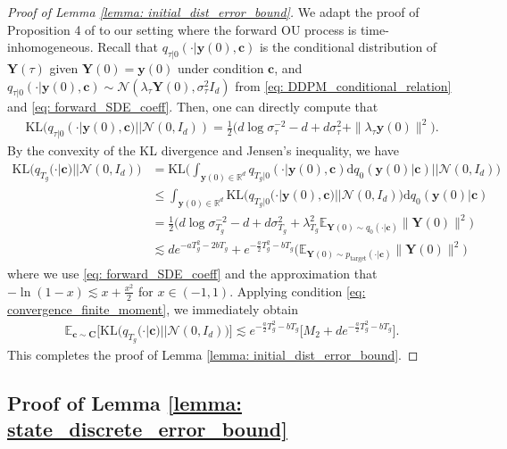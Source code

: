 \documentclass[11pt]{article}
\newcommand{\mE}{\mathbb{E}}
\newcommand{\mR}{\mathbb{R}}
\newcommand{\bY}{\mathbf{Y}}
\newcommand{\by}{\mathbf{y}}
\newcommand{\bc}{\mathbf{c}}
\newcommand{\bC}{\mathbf{C}}
\newcommand{\tar}{{\text{target}}}
\newcommand{\KL}{\text{KL}}
\newcommand{\intd}{\mathrm{d}}
\begin{document}
\begin{proof}[Proof of Lemma \ref{lemma: initial_dist_error_bound}]
We adapt the proof of Proposition 4 of \cite{bentonnearly} to our setting where the forward OU process is time-inhomogeneous. Recall that $q_{\tau | 0}(\cdot | \by(0),  \bc)$ is the conditional distribution of $\bY(\tau)$ given $\bY(0) = \by(0)$ under condition $\bc$, and $q_{\tau | 0}(\cdot | \by(0),  \bc) \sim \mathcal{N}(\lambda_\tau \bY(0), \sigma_\tau^2I_d)$ from \eqref{eq: DDPM_conditional_relation} and \eqref{eq: forward_SDE_coeff}. Then, one can directly compute that
\begin{align*}
    \KL(q_{\tau | 0}(\cdot | \by(0),  \bc) || \mathcal{N}(0, I_d)) = \frac{1}{2}\big(d\log\sigma_\tau^{-2} - d + d\sigma_\tau^2 + \|\lambda_\tau\by(0)\|^2\big).
\end{align*}
By the convexity of the KL divergence and Jensen's inequality, we have
\begin{align*}
    \KL\big(q_{T_g}(\cdot | \bc) || \mathcal{N}(0, I_d)\big) &= \KL\bigg(\int_{\by(0)\in\mR^d} q_{T_g | 0}(\cdot | \by(0), \bc) \intd q_0(\by(0) | \bc) \bigg|\bigg| \mathcal{N}(0, I_d)\bigg)\\
    &\le \int_{\by(0)\in\mR^d}\KL\big(q_{T_g | 0}(\cdot | \by(0), \bc) || \mathcal{N}(0, I_d)\big)\intd q_0(\by(0) | \bc)\\
    & =\frac{1}{2}\bigg(d\log\sigma_{T_g}^{-2} - d + d\sigma_{T_g}^2 + \lambda_{T_g}^2\mE_{\bY(0)\sim q_{0}(\cdot | \bc)}\|\bY(0)\|^2\bigg)\\
    &\lesssim de^{-aT_g^2 - 2bT_g} + e^{-\frac{a}{2}T_g^2 - bT_g}\big(\mE_{\bY(0)\sim p_\tar(\cdot | \bc)}\|\bY(0)\|^2\big)
\end{align*}
where we use \eqref{eq: forward_SDE_coeff} and the approximation that $-\ln(1 - x)\lesssim x + \frac{x^2}{2}$ for $x\in(-1, 1)$. Applying condition \eqref{eq: convergence_finite_moment}, we immediately obtain
\begin{align*}
    \mE_{\bc\sim\bC}\bigg[\KL\big(q_{T_g}(\cdot | \bc) || \mathcal{N}(0, I_d)\big)\bigg] \lesssim e^{-\frac{a}{2}T_g^2 - bT_g}\big[M_2 + de^{-\frac{a}{2}T_g^2 - bT_g}\big].
\end{align*}
This completes the proof of Lemma \ref{lemma: initial_dist_error_bound}.
\end{proof}

\subsection{Proof of Lemma \ref{lemma: state_discrete_error_bound}}\label{sec: state_discrretization_error}
\end{document}
